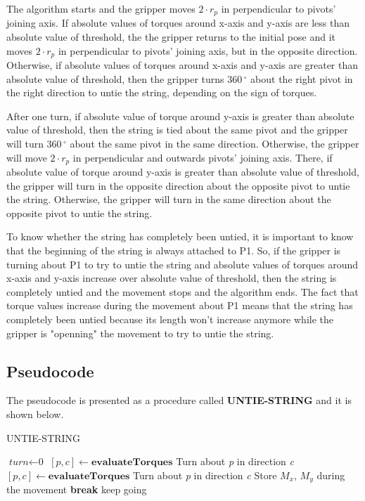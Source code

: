The algorithm starts and the gripper moves $2 \cdot r_{p}$ in perpendicular to pivots' joining axis. If absolute values of torques around x-axis and y-axis are less than absolute value of threshold, the the gripper returns to the initial pose and it moves $2 \cdot r_{p}$ in perpendicular to pivots' joining axis, but in the opposite direction. Otherwise,  if absolute values of torques around x-axis and y-axis are greater than absolute value of threshold, then the gripper turns 360$\,^{\circ}$ about the right pivot in the right direction to untie the string, depending on the sign of torques. 

After one turn, if absolute value of torque around y-axis is greater than absolute value of threshold, then the string is tied about the same pivot and the gripper will turn 360$\,^{\circ}$ about the same pivot in the same direction. Otherwise, the gripper will move $2 \cdot r_{p}$ in perpendicular and outwards pivots' joining axis. There, if absolute value of torque around y-axis is greater than absolute value of threshold, the gripper will turn in the opposite direction about the opposite pivot to untie the string. Otherwise, the gripper will turn in the same direction about the opposite pivot to untie the string.

To know whether the string has completely been untied, it is important to know that the beginning of the string is always attached to P1. So, if the gripper is turning about P1 to try to untie the string and absolute values of torques around x-axis and y-axis increase over absolute value of threshold, then the string is completely untied and the movement stops and the algorithm ends. The fact that torque values increase during the movement about P1 means that the string has completely been untied because its length won't increase anymore while the gripper is "openning" the movement to try to untie the string.

\subsection{Pseudocode}
The pseudocode is presented as a procedure called \textbf{UNTIE-STRING} and it is shown below.
\begin{algorithm}
	\caption{UNTIE-STRING}\label{euclid}
	\begin{algorithmic}[1]
		\State $\textit{turn} \gets \text{0}$
		\State $[\textit{p}, \textit{c}] \gets \textbf{evaluateTorques}$
		\State Turn about \textit{p} in direction \textit{c}
		\State $[\textit{p}, \textit{c}] \gets \textbf{evaluateTorques}$
		\State Turn about \textit{p} in direction \textit{c}
		\State Store $M_{x}$, $M_{y}$ during the movement
		\State \textbf{break}
		\Else 
		\State keep going
		\EndIf
		\EndIf
		\EndWhile
	\end{algorithmic}
\end{algorithm}

